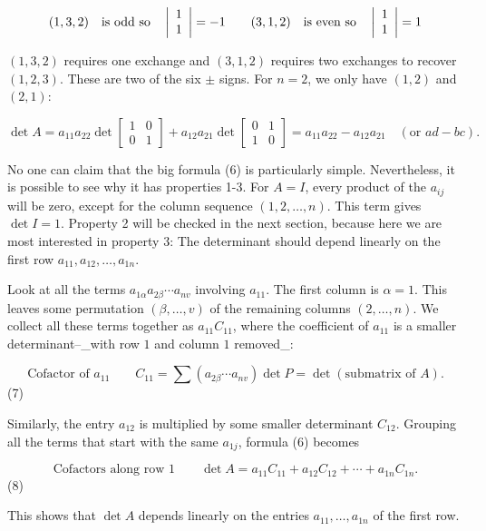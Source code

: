 \[(1,3,2)\quad\text{is odd so}\quad\left|\begin{array}{c}1\\ 1\end{array}\right|=-1\qquad(3,1,2)\quad\text{is even so}\quad\left|\begin{array} []{c}1\\ 1\end{array}\right|=1\]

\((1,3,2)\) requires one exchange and \((3,1,2)\) requires two exchanges to recover \((1,2,3)\). These are two of the six \(\pm\) signs. For \(n=2\), we only have \((1,2)\) and \((2,1)\):

\[\det A=a_{11}a_{22}\det\begin{bmatrix}1&0\\ 0&1\end{bmatrix}+a_{12}a_{21}\det\begin{bmatrix}0&1\\ 1&0\end{bmatrix}=a_{11}a_{22}-a_{12}a_{21}\quad(\text{or }ad-bc).\]

No one can claim that the big formula (6) is particularly simple. Nevertheless, it is possible to see why it has properties 1-3. For \(A=I\), every product of the \(a_{ij}\) will be zero, except for the column sequence \((1,2,\ldots,n)\). This term gives \(\det I=1\). Property 2 will be checked in the next section, because here we are most interested in property 3: The determinant should depend linearly on the first row \(a_{11},a_{12},\ldots,a_{1n}\).

Look at all the terms \(a_{1\alpha}a_{2\beta}\cdots a_{nv}\) involving \(a_{11}\). The first column is \(\alpha=1\). This leaves some permutation \((\beta,\ldots,v)\) of the remaining columns \((2,\ldots,n)\). We collect all these terms together as \(a_{11}C_{11}\), where the coefficient of \(a_{11}\) is a smaller determinant--_with row \(1\) and column \(1\) removed_:

\[\text{{Cofactor of $a_{11}$}}\qquad C_{11}=\sum(a_{2\beta}\cdots a_{nv})\det P= \det(\text{submatrix of $A$}).\] (7)

Similarly, the entry \(a_{12}\) is multiplied by some smaller determinant \(C_{12}\). Grouping all the terms that start with the same \(a_{1j}\), formula (6) becomes

\[\boxed{\text{{Cofactors along row 1}}}\qquad\det A=a_{11}C_{11}+a_{12}C_{12}+ \cdots+a_{1n}C_{1n}.\] (8)

This shows that \(\det A\) depends linearly on the entries \(a_{11},\ldots,a_{1n}\) of the first row.

